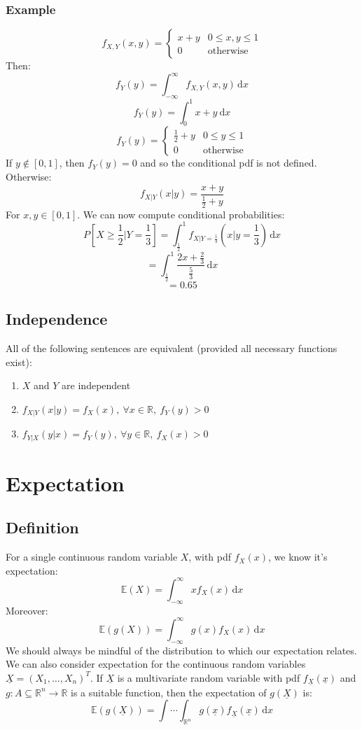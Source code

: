 \documentclass[12pt]{article}
\begin{document}
\subsubsection*{Example}
\[f_{X,Y}(x,y)=\begin{cases}
    x+y & 0\leq x,y\leq 1 \\
    0&\text{otherwise}
\end{cases}\]
Then:
\[f_Y(y)=\int^\infty_{-\infty}f_{X,Y}(x,y)\,\text{d}x\]
\[f_Y(y)=\int^1_0x+y\ \text{d}x\]
\[f_Y(y)=\begin{cases}
    \frac{1}{2}+y&0\leq y\leq 1 \\
    0 & \text{otherwise}
\end{cases}\]
If \(y\notin[0,1]\), then \(f_Y(y)=0\) and so the conditional pdf is not defined. Otherwise:
\[f_{X|Y}(x|y)=\frac{x+y}{\frac{1}{2}+y}\]
For \(x,y\in[0,1]\). We can now compute conditional probabilities:
\[P[X\geq \frac{1}{2}|Y=\frac{1}{3}]=\int^1_{\frac{1}{2}}f_{X|Y=\frac{1}{3}}(x|y=\frac{1}{3})\,\text{d}x\]
\[=\int^1_{\frac{1}{2}}\frac{2x+\frac{2}{3}}{\frac{5}{3}}\,\text{d}x\]
\[=0.65\]
\subsection{Independence}
All of the following sentences are equivalent (provided all necessary functions exist):
\begin{enumerate}
    \item \(X\) and \(Y\) are independent
    \item \(f_{X|Y}(x|y)=f_X(x),\ \forall x\in\mathbb{R},\  f_Y(y)>0\)
    \item \(f_{Y|X}(y|x)=f_Y(y),\ \forall y\in\mathbb{R},\  f_X(x)>0\)
\end{enumerate}
\clearpage
\section{Expectation}
\subsection{Definition}
For a single continuous random variable \(X\), with pdf \(f_X(x)\), we know it's expectation:
\[\mathbb{E}(X)=\int^\infty_{-\infty}xf_X(x)\,\text{d}x\]
Moreover:
\[\mathbb{E}(g(X))=\int^\infty_{-\infty}g(x)f_X(x)\,\text{d}x\]
We should always be mindful of the distribution to which our expectation relates. We can also consider expectation for the continuous random variables \(\underline{X}=(X_1,\dots,X_n)^T\). If \(\underline{X}\) is a multivariate random variable with pdf \(f_{\underline{X}}(\underline{x})\) and \(g:A\subseteq\mathbb{R}^n\to\mathbb{R}\) is a suitable function, then the expectation of \(g(\underline{X})\) is:
\[\mathbb{E}(g(\underline{X}))=\int\cdots\int_{\mathbb{R}^n}g(\underline{x})f_{\underline{X}}(\underline{x})\,\text{d}x\]
\end{document}
